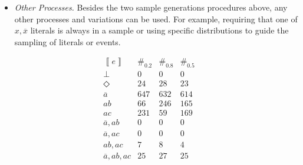 \documentclass{tlp}
\newcommand{\co}[1]{\ensuremath{\overline{#1}}}     %
\newcommand{\stablecore}[1]{\ensuremath{\left\llbracket #1 \right\rrbracket}}
\newcommand{\inconsistent}{\bot}
\newcommand{\indepclass}{\ensuremath{\Diamond}}
\newcommand{\class}[1]{\ensuremath{[{#1}]_{\sim}}}
\begin{document}
\begin{itemize}
\item \emph{Other Processes.} Besides the two sample generations
  procedures above, any other processes and variations can be used.
  For example, requiring that one of \(x, \co{x}\) literals is always
  in a sample or using specific distributions to guide the sampling of
  literals or events.

\end{itemize}

\begin{table}[t]
    \begin{center}
        \[
            \begin{array}{l|ccc}
                \stablecore{e}
                 & \#_{0.2}
                 & \#_{0.8}
                 & \#_{0.5}
                \\
                \hline
                \inconsistent
                 & 0
                 & 0
                 & 0        \\[2pt]
                \indepclass
                 & 24
                 & 28
                 & 23       \\[2pt]
                \co{a}
                 & 647
                 & 632
                 & 614      \\[2pt]
                ab
                 & 66
                 & 246
                 & 165      \\[2pt]
                ac
                 & 231
                 & 59
                 & 169      \\[2pt]
                \co{a}, ab
                 & 0
                 & 0
                 & 0        \\[2pt]
                \co{a}, ac
                 & 0
                 & 0
                 & 0
                \\[2pt]
                ab, ac
                 & 7
                 & 8
                 & 4        \\[2pt]
                \co{a}, ab, ac
                 & 25
                 & 27
                 & 25\end{array}
        \]
    \end{center}

    \caption{\emph{Experiments 2 and 3.} Results from experiments, each with \(n=1000\) samples generated following the \emph{Model+Noise} procedure, with parameters \(\alpha = 0.1, \beta = 0.3, \gamma = 0.8\) (Experiment 2:
    bias to \(ab\).) and \(\gamma=0.5\) (Experiment 3: balanced \(ab\) and \(ac\).).  Empirical distributions are represented by the random variables \(S_{0.8}\) and \(S_{0.5}\) respectively.  Data from experience \cref{tab:sbf.example} is also included, and denoted by \(S_{0.2}\), to provide reference.  Columns \(\#_{0.2}\), \(\#_{0.8}\) and \(\#_{0.5}\)
    contain \(\#\set{S_{0.2} \in \class{e}}\), \(\#\set{S_{0.8} \in \class{e}}\)
    and \(\#\set{S_{0.5} \in \class{e}}\), the respective number of events in each class.}\label{tab:sbf.examples.2.3}
\end{table}
\end{document}
